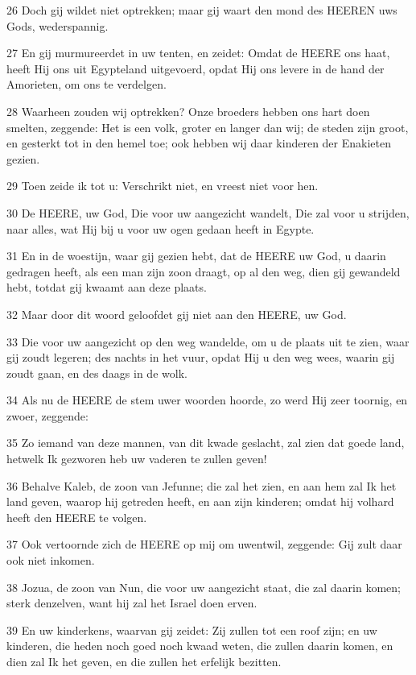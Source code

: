 \par 26 Doch gij wildet niet optrekken; maar gij waart den mond des HEEREN uws Gods, wederspannig.
\par 27 En gij murmureerdet in uw tenten, en zeidet: Omdat de HEERE ons haat, heeft Hij ons uit Egypteland uitgevoerd, opdat Hij ons levere in de hand der Amorieten, om ons te verdelgen.
\par 28 Waarheen zouden wij optrekken? Onze broeders hebben ons hart doen smelten, zeggende: Het is een volk, groter en langer dan wij; de steden zijn groot, en gesterkt tot in den hemel toe; ook hebben wij daar kinderen der Enakieten gezien.
\par 29 Toen zeide ik tot u: Verschrikt niet, en vreest niet voor hen.
\par 30 De HEERE, uw God, Die voor uw aangezicht wandelt, Die zal voor u strijden, naar alles, wat Hij bij u voor uw ogen gedaan heeft in Egypte.
\par 31 En in de woestijn, waar gij gezien hebt, dat de HEERE uw God, u daarin gedragen heeft, als een man zijn zoon draagt, op al den weg, dien gij gewandeld hebt, totdat gij kwaamt aan deze plaats.
\par 32 Maar door dit woord geloofdet gij niet aan den HEERE, uw God.
\par 33 Die voor uw aangezicht op den weg wandelde, om u de plaats uit te zien, waar gij zoudt legeren; des nachts in het vuur, opdat Hij u den weg wees, waarin gij zoudt gaan, en des daags in de wolk.
\par 34 Als nu de HEERE de stem uwer woorden hoorde, zo werd Hij zeer toornig, en zwoer, zeggende:
\par 35 Zo iemand van deze mannen, van dit kwade geslacht, zal zien dat goede land, hetwelk Ik gezworen heb uw vaderen te zullen geven!
\par 36 Behalve Kaleb, de zoon van Jefunne; die zal het zien, en aan hem zal Ik het land geven, waarop hij getreden heeft, en aan zijn kinderen; omdat hij volhard heeft den HEERE te volgen.
\par 37 Ook vertoornde zich de HEERE op mij om uwentwil, zeggende: Gij zult daar ook niet inkomen.
\par 38 Jozua, de zoon van Nun, die voor uw aangezicht staat, die zal daarin komen; sterk denzelven, want hij zal het Israel doen erven.
\par 39 En uw kinderkens, waarvan gij zeidet: Zij zullen tot een roof zijn; en uw kinderen, die heden noch goed noch kwaad weten, die zullen daarin komen, en dien zal Ik het geven, en die zullen het erfelijk bezitten.
